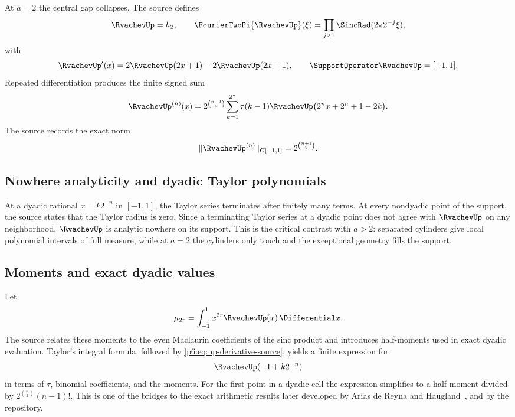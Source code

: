\documentclass[11pt,oneside]{article}
\numberwithin{equation}{section}
\theoremstyle{definition}
\theoremstyle{remark}
\begin{document}
At $a=2$ the central gap collapses.  The source defines
\begin{equation}\label{p6:eq:up-def-again}
 \RvachevUp=h_2,
 \qquad
 \FourierTwoPi{\RvachevUp}(\xi)=\prod_{j\ge1}\SincRad(2\pi2^{-j}\xi),
\end{equation}
with
\begin{equation}\label{p6:eq:up-diffeq}
 \RvachevUp'(x)=2\RvachevUp(2x+1)-2\RvachevUp(2x-1),
 \qquad \SupportOperator\RvachevUp=[-1,1].
\end{equation}
Repeated differentiation produces the finite signed sum
\begin{equation}\label{p6:eq:up-derivative-source}
 \RvachevUp^{(n)}(x)=2^{\binom{n+1}{2}}
 \sum_{k=1}^{2^n}\tau(k-1)
 \RvachevUp\bigl(2^n x+2^n+1-2k\bigr).
\end{equation}
The source records the exact norm
\begin{equation}\label{p6:eq:up-derivative-norm-source}
 \|\RvachevUp^{(n)}\|_{C[-1,1]}
 =2^{\binom{n+1}{2}}.
\end{equation}

\subsection{Nowhere analyticity and dyadic Taylor polynomials}

At a dyadic rational $x=k2^{-n}$ in $[-1,1]$, the Taylor series terminates after
finitely many terms.  At every nondyadic point of the support, the source states
that the Taylor radius is zero.  Since a terminating Taylor series at a dyadic
point does not agree with $\RvachevUp$ on any neighborhood, $\RvachevUp$ is analytic nowhere
on its support.  This is the critical contrast with $a>2$: separated cylinders
give local polynomial intervals of full measure, while at $a=2$ the cylinders
only touch and the exceptional geometry fills the support.

\subsection{Moments and exact dyadic values}

Let
\[
 \mu_{2r}=\int_{-1}^{1}x^{2r}\RvachevUp(x)\,\Differential x.
\]
The source relates these moments to the even Maclaurin coefficients of the sinc
product and introduces half-moments used in exact dyadic evaluation.  Taylor's
integral formula, followed by \eqref{p6:eq:up-derivative-source}, yields a finite
expression for
\begin{equation}\label{p6:eq:up-dyadic-values}
 \RvachevUp(-1+k2^{-n})
\end{equation}
in terms of $\tau$, binomial coefficients, and the moments.  For the first point
in a dyadic cell the expression simplifies to a half-moment divided by
$2^{\binom{n}{2}}(n-1)!$.  This is one of the bridges to the exact arithmetic
results later developed by Arias de Reyna and Haugland~\cite{p6:arias-arithmetic,p6:haugland}, and by the repository.
\end{document}

